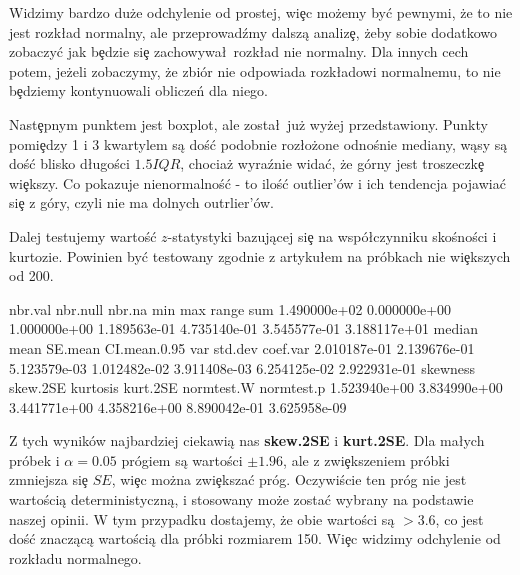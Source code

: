 \documentclass{article}
\begin{document}
\noindent
\quad Widzimy bardzo duże odchylenie od prostej, wi\c ec możemy by\'c pewnymi, że to nie jest rozk\l ad normalny, ale przeprowadźmy dalszą analiz\c e, żeby sobie dodatkowo zobaczy\'c jak b\c edzie si\c e zachowywa\l\ rozk\l ad nie normalny. Dla innych cech potem, jeżeli zobaczymy, że zbiór nie odpowiada rozk\l adowi normalnemu, to nie b\c edziemy kontynuowali obliczeń dla niego.

\noindent
\quad Nast\c epnym punktem jest boxplot, ale zosta\l\ już wyżej przedstawiony. Punkty pomi\c edzy 1 i 3 kwartylem są doś\'c podobnie roz\l ożone odnośnie mediany, wąsy są doś\'c blisko d\l ugości $1.5IQR$, chociaż wyraźnie wida\'c, że górny jest troszeczk\c e wi\c ekszy. Co pokazuje nienormalnoś\'c - to iloś\'c outlier'ów i ich tendencja pojawia\'c si\c e z góry, czyli nie ma dolnych outrlier'ów.

\noindent
\quad Dalej testujemy wartoś\'c $z$-statystyki bazującej si\c e na wspó\l czynniku skośności i kurtozie. Powinien by\'c testowany zgodnie z artyku\l em na próbkach nie wi\c ekszych od 200.

\begin{Schunk}
\begin{Soutput}
     nbr.val     nbr.null       nbr.na          min          max        range          sum 
1.490000e+02 0.000000e+00 1.000000e+00 1.189563e-01 4.735140e-01 3.545577e-01 3.188117e+01 
      median         mean      SE.mean CI.mean.0.95          var      std.dev     coef.var 
2.010187e-01 2.139676e-01 5.123579e-03 1.012482e-02 3.911408e-03 6.254125e-02 2.922931e-01 
    skewness     skew.2SE     kurtosis     kurt.2SE   normtest.W   normtest.p 
1.523940e+00 3.834990e+00 3.441771e+00 4.358216e+00 8.890042e-01 3.625958e-09 
\end{Soutput}
\end{Schunk}

\noindent
\quad Z tych wyników najbardziej ciekawią nas \textbf{skew.2SE} i \textbf{kurt.2SE}. Dla ma\l ych próbek i $\alpha = 0.05$ prógiem są wartości $$, ale z zwi\c ekszeniem próbki zmniejsza si\c e $SE$, wi\c ec można zwi\c eksza\'c próg. Oczywiście ten próg nie jest wartością deterministyczną, i stosowany może zosta\'c wybrany na podstawie naszej opinii. W tym przypadku dostajemy, że obie wartości są $> 3.6$, co jest doś\'c znaczącą wartością dla próbki rozmiarem 150. Wi\c ec widzimy odchylenie od rozk\l adu normalnego.
\end{document}
